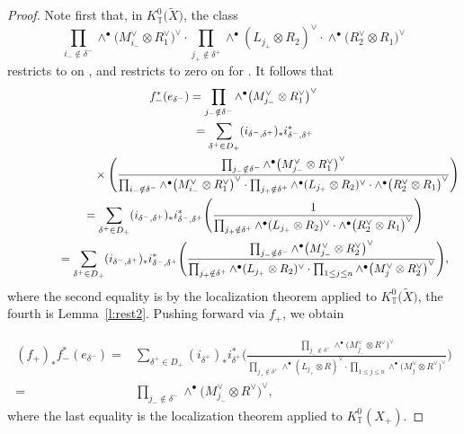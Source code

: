\documentclass[11pt]{article}
\numberwithin{equation}{section}
\numberwithin{equation}{section}
\newcommand{\torus}{\mathbb{T}}
\newcommand{\MB}{M}
\newcommand{\LB}{L}
\begin{document}
\begin{proof}
Note first that,
in $K^0_\torus\bigl(\tilde X\bigr)$, the class
\[
\prod_{ i_{-} \notin \delta^-} \wedge^\bullet \bigl(\MB_{i_{-}}^\vee \otimes R_1^\vee\bigr)^\vee \cdot \prod_{j_{+} \notin \delta^+} \wedge^\bullet ( \LB_{j_+} \otimes R_2)^\vee \cdot \wedge^\bullet \bigl(R_2^\vee \otimes R_1\bigr)^\vee
\]
restricts to  on
, and restricts to zero on  for .
It follows that
\begin{gather*}
f_{-}^*(e_{\delta^-}) = \prod_{j_- \notin \delta^-} \wedge^\bullet \bigl(\MB_{j_-}^\vee \otimes R_1^\vee\bigr)^\vee \\
\hphantom{f_{-}^*(e_{\delta^-})}{}
= \sum_{\delta^+ \in D_{+}} (i_{\delta^-, \delta^+})_*i_{\delta^-, \delta^+}^* \\
\hphantom{f_{-}^*(e_{\delta^-}) =\sum_{\delta^+ \in D_{+}}}{}
 \times\Biggl(\frac{\prod_{j_- \notin \delta^-} \wedge^\bullet \bigl(\MB_{j_-}^\vee \otimes R_1^\vee\bigr)^\vee}
{ \prod_{ i_{-} \notin \delta^-} \wedge^\bullet \bigl(\MB_{i_{-}}^\vee \otimes R_1^\vee\bigr)^\vee \cdot \prod_{j_{+} \notin \delta^+} \wedge^\bullet ( \LB_{j_+} \otimes R_2)^\vee \cdot \wedge^\bullet \bigl(R_2^\vee \otimes R_1\bigr)^\vee}\Biggr)
\\
\hphantom{f_{-}^*(e_{\delta^-})}{}
= \sum_{\delta^+ \in D_{+}} (i_{\delta^-, \delta^+})_*i_{\delta^-, \delta^+}^* \Biggl(\frac{1}
{ \prod_{j_{+} \notin \delta^+} \wedge^\bullet ( \LB_{j_+} \otimes R_2)^\vee \cdot \wedge^\bullet \bigl(R_2^\vee \otimes R_1\bigr)^\vee}\Biggr)
\\
\hphantom{f_{-}^*(e_{\delta^-})}{}
= \sum_{\delta^+ \in D_{+}} (i_{\delta^-, \delta^+})_*i_{\delta^-, \delta^+}^* \Biggl(\frac{\prod_{j_- \notin \delta^-} \wedge^\bullet \bigl(\MB_{j_-}^\vee \otimes R_2^\vee\bigr)^\vee }
{ \prod_{j_{+} \notin \delta^+} \wedge^\bullet ( \LB_{j_+} \otimes R_2)^\vee \cdot \prod_{1 \leq j \leq n} \wedge^\bullet \bigl(\MB_{j}^\vee \otimes R_2^\vee\bigr)^\vee }\Biggr),
\end{gather*}
where the second equality is by the localization theorem applied to $K^0_\torus\bigl(\tilde X\bigr)$, the fourth is Lemma~\ref{l:rest2}.
Pushing forward via $f_{+}$, we obtain

\begin{align*}
(f_{+})_* f_{-}^*(e_{\delta^-})
={}& \sum_{\delta^+ \in D_{+}} (i_{\delta^+})_*i_{\delta^+}^* \Biggl(\frac{\prod_{j_- \notin \delta^-} \wedge^\bullet \bigl(\MB_{j_-}^\vee \otimes R^\vee\bigr)^\vee }
{ \prod_{j_{+} \notin \delta^+} \wedge^\bullet ( \LB_{j_+} \otimes R)^\vee \cdot \prod_{1 \leq j \leq n} \wedge^\bullet \bigl(\MB_{j}^\vee \otimes R^\vee\bigr)^\vee }\Biggr) \\
={}& \prod_{j_- \notin \delta^-} \wedge^\bullet \bigl(\MB_{j_-}^\vee \otimes R^\vee\bigr)^\vee,
\end{align*}
where the last equality is the localization theorem applied to $K^0_\torus(X_{+})$.
\end{proof}
\end{document}
